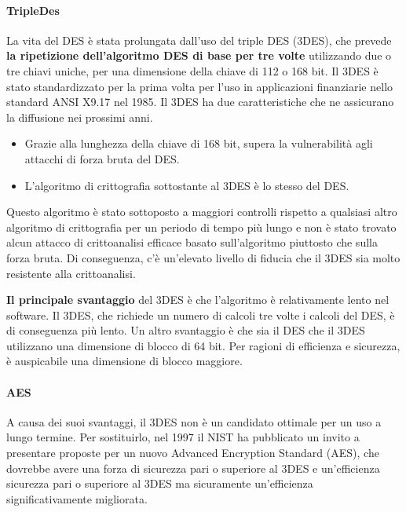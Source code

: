 \singlespacing

\paragraph{TripleDes} La vita del DES è stata prolungata dall'uso del triple DES (3DES), che prevede \textbf{la ripetizione dell'algoritmo DES di base per tre volte} utilizzando due o tre chiavi uniche, per una dimensione della chiave di 112 o 168 bit. Il 3DES è stato standardizzato per la prima volta per l'uso in applicazioni finanziarie nello standard ANSI X9.17 nel 1985. Il 3DES ha due caratteristiche che ne assicurano la diffusione nei prossimi anni.

\begin{itemize}
    \item Grazie alla lunghezza della chiave di 168 bit, supera la vulnerabilità agli attacchi di forza bruta del DES.
    
    \item L'algoritmo di crittografia sottostante al 3DES è lo stesso del DES.
\end{itemize}

Questo algoritmo è stato sottoposto a maggiori controlli rispetto a qualsiasi altro algoritmo di crittografia per un periodo di tempo più lungo e non è stato trovato alcun attacco di crittoanalisi efficace basato sull'algoritmo piuttosto che sulla forza bruta. Di conseguenza, c'è un'elevato livello di fiducia che il 3DES sia molto resistente alla crittoanalisi.

\singlespacing

\textbf{Il principale svantaggio} del 3DES è che l'algoritmo è relativamente lento nel software. Il 3DES, che richiede un numero di calcoli tre volte i calcoli del DES, è di conseguenza più lento. Un altro svantaggio è che sia il DES che il 3DES utilizzano una dimensione di blocco di 64 bit. Per ragioni di efficienza e sicurezza, è auspicabile una dimensione di blocco maggiore.

\singlespacing

\paragraph{AES} A causa dei suoi svantaggi, il 3DES non è un candidato ottimale per un uso a lungo termine.
Per sostituirlo, nel 1997 il NIST ha pubblicato un invito a presentare proposte per un nuovo Advanced Encryption Standard (AES), che dovrebbe avere una forza di sicurezza pari o superiore al 3DES e un'efficienza sicurezza pari o superiore al 3DES ma sicuramente un'efficienza significativamente migliorata.

